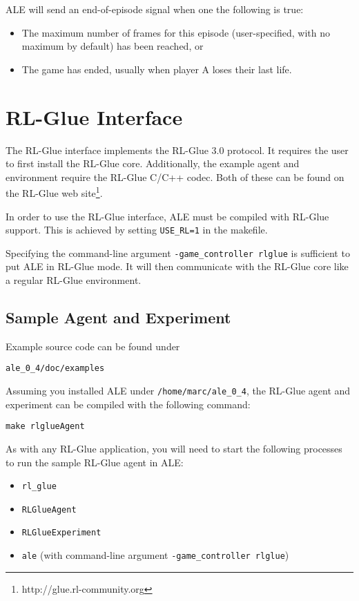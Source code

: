 \documentclass[12pt]{article}
\begin{document}
ALE will send an end-of-episode signal when one the following is true:

\begin{itemize}
  \item{The maximum number of frames for this episode (user-specified, with no maximum by default) has been reached, or}
  \item{The game has ended, usually when player A loses their last life.}
\end{itemize}

\section{RL-Glue Interface}\label{sec:rlglue_interface}

The RL-Glue interface implements the RL-Glue 3.0 protocol.
It requires the user to first install the RL-Glue core. Additionally, the example agent and 
environment require the RL-Glue C/C++ codec. Both of these can be found on the RL-Glue web
site\footnote{http://glue.rl-community.org}.

In order to use the RL-Glue interface, ALE must be compiled with RL-Glue support. This is achieved
by setting \verb+USE_RL=1+ in the makefile.

Specifying the command-line argument \verb+-game_controller rlglue+ is sufficient to put ALE in 
RL-Glue mode. It will then communicate with the RL-Glue core like a regular RL-Glue environment.

\subsection{Sample Agent and Experiment}

Example source code can be found under

\begin{verbatim}
ale_0_4/doc/examples
\end{verbatim}

Assuming you installed ALE under \verb+/home/marc/ale_0_4+, the RL-Glue agent and experiment
can be compiled with the following command: 

\begin{verbatim}
make rlglueAgent 
\end{verbatim}

As with any RL-Glue application, you will need to start the following processes to run the
sample RL-Glue agent in ALE:

\begin{itemize}
  \item{\verb+rl_glue+} 
  \item{\verb+RLGlueAgent+}
  \item{\verb+RLGlueExperiment+}
  \item{\verb+ale+ (with command-line argument \verb+-game_controller rlglue+)}
\end{itemize}
\end{document}
